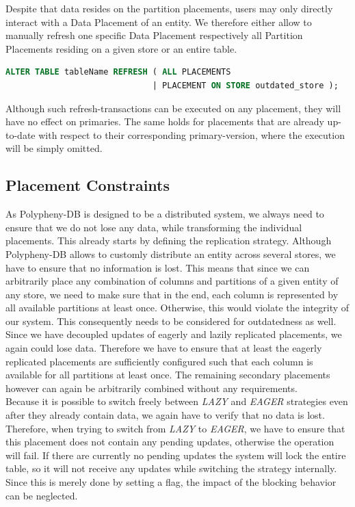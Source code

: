 Despite that data resides on the partition placements, users may only directly interact with a Data Placement of an entity.
We therefore either allow to manually refresh one specific Data Placement respectively all Partition Placements residing on a given store or an entire table.

\begin{lstlisting}[language=sql, caption={SQL Statement Syntax for an On-Demand Refresh Operation},label={lst:refresh}]
ALTER TABLE tableName REFRESH ( ALL PLACEMENTS 
                              | PLACEMENT ON STORE outdated_store );
\end{lstlisting}

Although such refresh-transactions can be executed on any placement, they will have no effect on primaries. 
The same holds for placements that are already up-to-date with respect to their corresponding primary-version, where the execution will be simply omitted.





\subsection{Placement Constraints}
\label{sec:constraints}

As Polypheny-DB is designed to be a distributed system, we always need to ensure that we do not lose any data, while transforming the individual placements. 
This already starts by defining the replication strategy. Although Polypheny-DB allows to customly distribute an entity across several stores, we have to ensure that no 
information is lost. This means that since we can arbitrarily place any combination of columns and partitions of a given entity of any store, we need to make sure that in the end, 
each column is represented by all available partitions at least once. Otherwise, this would violate the integrity of our system. 
This consequently needs to be considered for outdatedness as well. Since we have decoupled updates of eagerly and lazily replicated placements, we again could lose data. 
Therefore we have to ensure that at least the eagerly replicated placements are sufficiently configured such that each column is available for all partitions at least once.
The remaining secondary placements however can again be arbitrarily combined without any requirements.\\
Because it is possible to switch freely between \emph{LAZY} and \emph{EAGER} strategies even after they already contain data, we again have to verify that no data is lost.
Therefore, when trying to switch from \emph{LAZY} to \emph{EAGER}, we have to ensure that this placement does not contain any pending updates, otherwise the operation will fail.
If there are currently no pending updates the system will lock the entire table, so it will not receive any updates while switching the strategy internally. 
Since this is merely done by setting a flag, the impact of the blocking behavior can be neglected.

